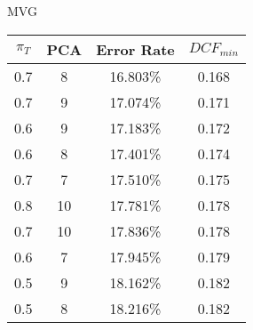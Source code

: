 \caption{MVG}\label{tab:mvg_acctable}
\begin{center}
\begin{tabular}{|c|c|c|c|}
\hline
$\pi_T$ & PCA & Error Rate & $DCF_{min}$\\
\hline
0.7 & 8 & 16.803\% & 0.168\\
\hline
0.7 & 9 & 17.074\% & 0.171\\
\hline
0.6 & 9 & 17.183\% & 0.172\\
\hline
0.6 & 8 & 17.401\% & 0.174\\
\hline
0.7 & 7 & 17.510\% & 0.175\\
\hline
0.8 & 10 & 17.781\% & 0.178\\
\hline
0.7 & 10 & 17.836\% & 0.178\\
\hline
0.6 & 7 & 17.945\% & 0.179\\
\hline
0.5 & 9 & 18.162\% & 0.182\\
\hline
0.5 & 8 & 18.216\% & 0.182\\
\hline
\end{tabular}
\end{center}
